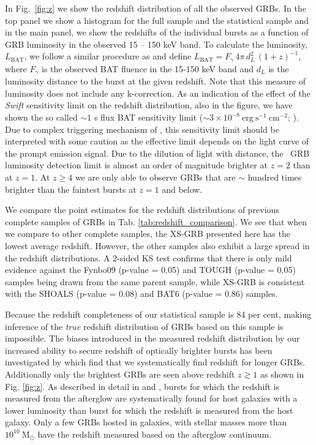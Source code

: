 \documentclass{aa}    %
\begin{document}
In Fig.~\ref{fig:z} we show the redshift distribution of all  the observed GRBs.
In the top panel we show a histogram for the full sample and the statistical
sample and in the main panel, we show the redshifts of the individual bursts as
a function of GRB luminosity in the observed 15 -- 150 keV band. To calculate the
luminosity, $L_{\mathrm{BAT}}$, we follow a similar procedure as
\citet{Lien2016} and define $L_{\mathrm{BAT}} = F_{\gamma}\,4
\pi\,d_L^2\,(1+z)^{-1}$, where $F_{\gamma}$ is the observed BAT fluence in the
15-150 keV band and $d_L$ is the luminosity distance to the burst at the given
redshift. Note that this measure of luminosity does not include any
k-correction. As an indication of the effect of the \textit{Swift} sensitivity
limit on the redshift distribution, also in the figure, we have shown the so
called $\sim 1$ s flux BAT sensitivity limit ($\sim 3 \times
10^{-8}~\mathrm{erg}~\mathrm{s}^{-1}~\mathrm{cm}^{-2}$;
\citealt{Baumgartner2013, Lien2016}). Due to complex triggering mechanism of
\swift, this sensitivity limit should be interpreted with some caution as the
effective limit depends on the light curve of the prompt emission signal. Due to
the dilution of light with distance, the \swift~GRB luminosity detection limit
is almost an order of magnitude brighter at $z=2$ than at $z=1$. At $z\geq4$
we are only able to observe GRBs that are $\sim$ hundred times brighter than the
faintest bursts at $z=1$ and below.

We compare the point estimates for the redshift distributions of previous
complete samples of GRBs in Tab. \ref{tab:redshift_comparison}. We see that when
we compare to other complete samples, the XS-GRB presented here has the lowest
average redshift. However, the other samples also exhibit a large spread in the
redshift distributions. A 2-sided KS test confirms that there is only mild
evidence against the Fynbo09 (p-value = 0.05) and TOUGH (p-value = 0.05) samples
being drawn from the same parent sample, while XS-GRB is consistent with the
SHOALS (p-value = 0.08) and BAT6 (p-value = 0.86) samples.

Because the redshift completeness of our statistical sample is 84 per cent,
making inference of the \textit{true} redshift distribution of GRBs based on
this sample is impossible. The biases introduced in the measured redshift
distribution by our increased ability to secure redshift of optically brighter
bursts has been investigated by \citet{Turpin2016} which find that we
systematically find redshift for longer GRBs. Additionally only the brightest
GRBs are seen above redshift $z \gtrsim 1$ as shown in Fig. \ref{fig:z}. As
described in detail in \citet{Hjorth2012} and \citet{Perley2016b}, bursts for which the redshift is
measured from the afterglow are systematically found for host galaxies with a
lower luminosity than burst for which the redshift is measured from the host
galaxy. Only a few GRBs hosted in galaxies, with stellar masses more than
$10^{10}~\mathrm{M}_\odot$ have the redshift measured based on the afterglow
continuum.
\end{document}
